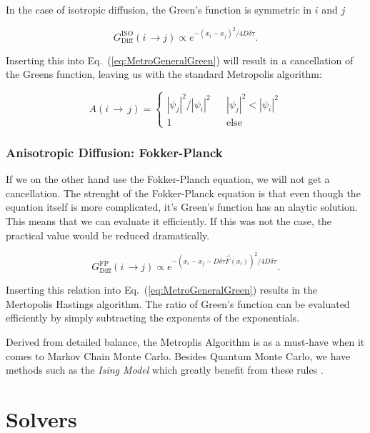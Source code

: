 In the case of isotropic diffusion, the Green's function is symmetric in $i$ and $j$ \cite{abInitioMC}

\begin{equation}
 G_{\mathrm{Diff}}^{\mathrm{ISO}}(i\,\rightarrow j) \propto e^{-(x_i-x_j)^2/4D\delta\tau}  .
\end{equation}

Inserting this into Eq.~(\ref{eq:MetroGeneralGreen}) will result in a cancellation of the Greens function, leaving us with the standard Metropolis algorithm:

\begin{equation}
\label{eq:Metropolis_standard}
 A(i\,\rightarrow\,j) = \left\{\begin{array}{ccc}
 |\psi_j|^2/|\psi_i|^2& & |\psi_j|^2 < |\psi_i|^2\\
1  & & \mathrm{else}  \end{array}\right.
\end{equation}

\subsubsection{Anisotropic Diffusion: Fokker-Planck}

If we on the other hand use the Fokker-Planch equation, we will not get a cancellation. The strenght of the Fokker-Planck equation is that even though the equation itself is more complicated, it's Green's function has an alaytic solution. This means that we can evaluate it efficiently. If this was not the case, the practical value would be reduced dramatically.

\begin{equation}
 G_\mathrm{Diff}^\mathrm{FP}(i\,\rightarrow j) \propto e^{-(x_i-x_j - D\delta\tau\vec F(x_i))^2/4D\delta\tau}.
\end{equation}

Inserting this relation into Eq.~(\ref{eq:MetroGeneralGreen}) results in the Mertopolis Hastings algorithm. The ratio of Green's function can be evaluated efficiently by simply subtracting the exponents of the exponentials.

Derived from detailed balance, the Metroplis Algorithm is as a must-have when it comes to Markov Chain Monte Carlo. Besides Quantum Monte Carlo, we have methods such as the \textit{Ising Model} which greatly benefit from these rules \cite{morten}.

\section{Solvers}







